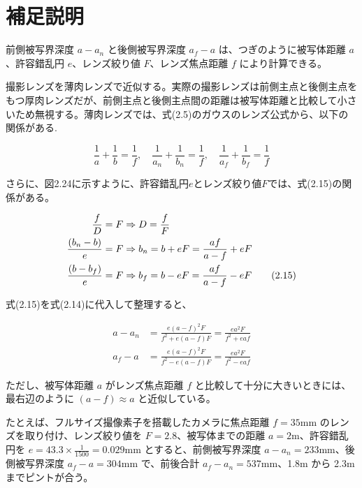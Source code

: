 \documentclass{jsarticle}
\begin{document}
\section*{補足説明}

前側被写界深度 $a - a_n$ と後側被写界深度 $a_f - a$ は、つぎのように被写体距離 $a$、許容錯乱円 $e$、レンズ絞り値 $F$、レンズ焦点距離 $f$ により計算できる。

撮影レンズを薄肉レンズで近似する。実際の撮影レンズは前側主点と後側主点をもつ厚肉レンズだが、前側主点と後側主点間の距離は被写体距離と比較して小さいため無視する。薄肉レンズでは、式(2.5)のガウスのレンズ公式から、以下の関係がある.

\begin{equation}
\frac{1}{a} + \frac{1}{b} = \frac{1}{f}, \quad
\frac{1}{a_n} + \frac{1}{b_n} = \frac{1}{f}, \quad
\frac{1}{a_f} + \frac{1}{b_f} = \frac{1}{f}
\tag{2.14}
\end{equation}

さらに、図2.24に示すように、許容錯乱円$e$とレンズ絞り値$F$では、式(2.15)の関係がある。


\begin{align}
\frac{f}{D} = F &\Rightarrow D = \frac{f}{F} \notag \\
\frac{(b_n - b)}{e} = F &\Rightarrow b_n = b + eF = \frac{af}{a - f} + eF \notag \\
\frac{(b - b_f)}{e} = F &\Rightarrow b_f = b - eF = \frac{af}{a - f} - eF
\tag{2.15}
\end{align}

式(2.15)を式(2.14)に代入して整理すると、

\begin{align}
a - a_n &= \frac{e(a - f)^2 F}{f^2 + e(a - f)F} = \frac{ea^2 F}{f^2 + eaf} \tag{2.16} \\
a_f - a &= \frac{e(a - f)^2 F}{f^2 - e(a - f)F} = \frac{ea^2 F}{f^2 - eaf} \tag{2.17}
\end{align}

ただし、被写体距離 $a$ がレンズ焦点距離 $f$ と比較して十分に大きいときには、最右辺のように $(a - f) \approx a$ と近似している。

たとえば、フルサイズ撮像素子を搭載したカメラに焦点距離 $f = 35$mm のレンズを取り付け、レンズ絞り値を $F = 2.8$、被写体までの距離 $a = 2$m、許容錯乱円を $e = 43.3 \times \frac{1}{1500} = 0.029$mm とすると、前側被写界深度 $a - a_n = 233$mm、後側被写界深度 $a_f - a = 304$mm で、前後合計 $a_f - a_n = 537$mm、1.8m から 2.3m までピントが合う。
\end{document}
